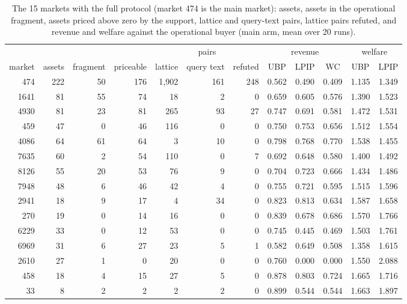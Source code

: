 
\begin{table}[tp]
  \centering
  \footnotesize
  \caption{The 15 \sqlshare{} markets with the full protocol (market 474 is the main market): assets, assets in the operational fragment, assets priced above zero by the \qirana{} support, lattice and query-text pairs, lattice pairs refuted, and revenue and welfare against the operational buyer (main arm, mean over 20 runs).}
  \label{tab:app-markets}
  \begin{tabular}{@{}rrrrrrrccccc@{}}
    \toprule
    & & & & \multicolumn{3}{c}{pairs} & \multicolumn{3}{c}{revenue} & \multicolumn{2}{c}{welfare} \\
    \cmidrule(lr){5-7}\cmidrule(lr){8-10}\cmidrule(lr){11-12}
    market & assets & fragment & priceable & lattice & query text & refuted & UBP & LPIP & \qirana{} WC & UBP & LPIP \\
    \midrule
    474 & 222 & 50 & 176 & 1,902 & 161 & 248 & 0.562 & 0.490 & 0.409 & 1.135 & 1.349 \\
    1641 & 81 & 55 & 74 & 18 & 2 & 0 & 0.659 & 0.605 & 0.576 & 1.390 & 1.523 \\
    4930 & 81 & 23 & 81 & 265 & 93 & 27 & 0.747 & 0.691 & 0.581 & 1.472 & 1.531 \\
    459 & 47 & 0 & 46 & 116 & 0 & 0 & 0.750 & 0.753 & 0.656 & 1.512 & 1.554 \\
    4086 & 64 & 61 & 64 & 3 & 10 & 0 & 0.798 & 0.768 & 0.770 & 1.538 & 1.455 \\
    7635 & 60 & 2 & 54 & 110 & 0 & 7 & 0.692 & 0.648 & 0.580 & 1.400 & 1.492 \\
    8126 & 55 & 20 & 53 & 76 & 9 & 0 & 0.704 & 0.723 & 0.666 & 1.434 & 1.486 \\
    7948 & 48 & 6 & 46 & 42 & 4 & 0 & 0.755 & 0.721 & 0.595 & 1.515 & 1.596 \\
    2941 & 18 & 9 & 17 & 4 & 34 & 0 & 0.823 & 0.813 & 0.634 & 1.587 & 1.658 \\
    270 & 19 & 0 & 14 & 16 & 0 & 0 & 0.839 & 0.678 & 0.686 & 1.570 & 1.766 \\
    6229 & 33 & 0 & 12 & 53 & 0 & 0 & 0.745 & 0.445 & 0.469 & 1.503 & 1.761 \\
    6969 & 31 & 6 & 27 & 23 & 5 & 1 & 0.582 & 0.649 & 0.508 & 1.358 & 1.615 \\
    2610 & 27 & 1 & 0 & 20 & 0 & 0 & 0.760 & 0.000 & 0.000 & 1.550 & 2.088 \\
    458 & 18 & 4 & 15 & 27 & 5 & 0 & 0.878 & 0.803 & 0.724 & 1.665 & 1.716 \\
    33 & 8 & 2 & 2 & 2 & 2 & 0 & 0.899 & 0.544 & 0.544 & 1.663 & 1.897 \\
    \bottomrule
  \end{tabular}
\end{table}
